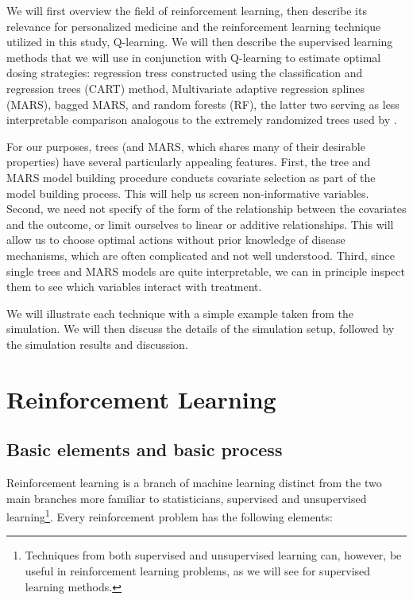 \documentclass[12pt]{article}
\begin{document}
We will first overview the field of reinforcement learning, then describe its relevance for personalized medicine and the reinforcement learning technique utilized in this study, Q-learning. We will then describe the supervised learning methods that we will use in conjunction with Q-learning to estimate optimal dosing strategies: regression tress constructed using the classification and regression trees (CART) method, Multivariate adaptive regression splines (MARS), bagged MARS, and random forests (RF), the latter two serving as less interpretable comparison analogous to the extremely randomized trees used by \textcite{crt}.

For our purposes, trees (and MARS, which shares many of their desirable properties) have several particularly appealing features. First, the tree and MARS model building procedure conducts covariate selection as part of the model building process. This will help us screen non-informative variables. Second, we need not specify of the form of the relationship between the covariates and the outcome, or limit ourselves to linear or additive relationships. This will allow us to choose optimal actions without prior knowledge of disease mechanisms, which are often complicated and not well understood. Third, since single trees and MARS models are quite interpretable, we can in principle inspect them to see which variables interact with treatment.

We will illustrate each technique with a simple example taken from the simulation. We will then discuss the details of the simulation setup, followed by the simulation results and discussion.


\section{Reinforcement Learning} %
\label{sec:reinforcement_learning}

\subsection{Basic elements and basic process} %
\label{sub:basic_process}

Reinforcement learning is a branch of machine learning distinct from the two main branches more familiar to statisticians, supervised and unsupervised learning\footnote{Techniques from both supervised and unsupervised learning can, however, be useful in reinforcement learning problems, as we will see for supervised learning methods.}. Every reinforcement problem has the following elements:
\end{document}
